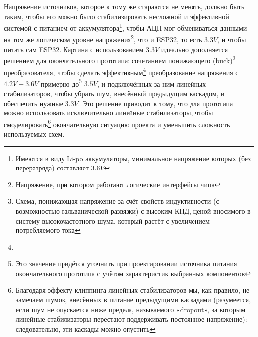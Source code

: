 \documentclass[a4paper, 10pt, final]{article} %
\begin{document}
    Напряжение источников, которое к тому же стараются не менять, должно быть таким, чтобы его можно было стабилизировать несложной и эффективной системой с питанием от аккумулятора\footnote{Имеются в виду Li-po аккумуляторы, минимальное напряжение которых (без переразряда) составляет $3.6V$}, чтобы АЦП мог обмениваться данными на том же логическом уровне напряжения\footnote{Напряжение, при котором работают логические интерфейсы чипа}, что и ESP32, то есть $3.3V$, и чтобы питать сам ESP32.
    Картина с использованием $3.3V$ идеально дополняется решением для окончательного прототипа: сочетанием понижающего (buck)\footnote{Схема, понижающая напряжение за счёт свойств индуктивности (с возможностью гальванической развязки) с высоким КПД, ценой вносимого в систему высокочастотного шума, который растёт с увеличением потребляемого тока} преобразователя, чтобы сделать эффективным\footnote{} преобразование напряжения с $4.2V-3.6V$ примерно до\footnote{Это значение придётся уточнить при проектировании источника питания окончательного прототипа с учётом характеристик выбранных компонентов} $3.5V$, и подключённых за ним линейных стабилизаторов, чтобы убрать шум, внесённый предыдущим каскадом, и обеспечить нужные $3.3V$.
    Это решение приводит к тому, что для прототипа можно использовать исключительно линейные стабилизаторы, чтобы смоделировать\footnote{Благодаря эффекту клиппинга линейных стабилизаторов мы, как правило, не замечаем шумов, внесённых в питание предыдущими каскадами (разумеется, если шум не опускается ниже предела, называемого «dropout», за которым линейные стабилизаторы перестают поддерживать постоянное напряжение): следовательно, эти каскады можно опустить} окончательную ситуацию проекта и уменьшить сложность используемых схем.
\end{document}
